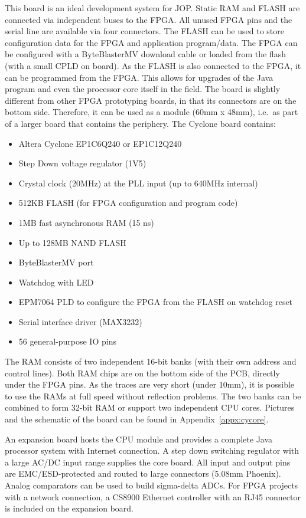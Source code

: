 This board is an ideal development system for JOP. Static RAM and
FLASH are connected via independent buses to the FPGA. All unused
FPGA pins and the serial line are available via four connectors. The
FLASH can be used to store configuration data for the FPGA and
application program/data. The FPGA can be configured with a
ByteBlasterMV download cable or loaded from the flash (with a small
CPLD on board). As the FLASH is also connected to the FPGA, it can
be programmed from the FPGA. This allows for upgrades of the Java
program and even the processor core itself in the field. The board
is slightly different from other FPGA prototyping boards, in that
its connectors are on the bottom side. Therefore, it can be used as
a module (60mm x 48mm), i.e.\ as part of a larger board that
contains the periphery. The Cyclone board contains:
%
\begin{itemize}
\item Altera Cyclone EP1C6Q240 or EP1C12Q240
\item Step Down voltage regulator (1V5)
\item Crystal clock (20MHz) at the PLL input (up to 640MHz internal)
\item 512KB FLASH (for FPGA configuration and program code)
\item 1MB fast asynchronous RAM (15 ns)
\item Up to 128MB NAND FLASH
\item ByteBlasterMV port
\item Watchdog with LED
\item EPM7064 PLD to configure the FPGA from the FLASH on watchdog reset
\item Serial interface driver (MAX3232)
\item 56 general-purpose IO pins
\end{itemize}
%
The RAM consists of two independent 16-bit banks (with their own
address and control lines). Both RAM chips are on the bottom side of
the PCB, directly under the FPGA pins. As the traces are very short
(under 10mm), it is possible to use the RAMs at full speed without
reflection problems. The two banks can be combined to form 32-bit
RAM or support two independent CPU cores. Pictures and the schematic
of the board can be found in Appendix~\ref{appx:cycore}.

An expansion board hosts the CPU module and provides a complete Java
processor system with Internet connection. A step down switching
regulator with a large AC/DC input range supplies the core board.
All input and output pins are EMC/ESD-protected and routed to large
connectors (5.08mm Phoenix). Analog comparators can be used to build
sigma-delta ADCs. For FPGA projects with a network connection, a
CS8900 Ethernet controller with an RJ45 connector is included on the
expansion board.

